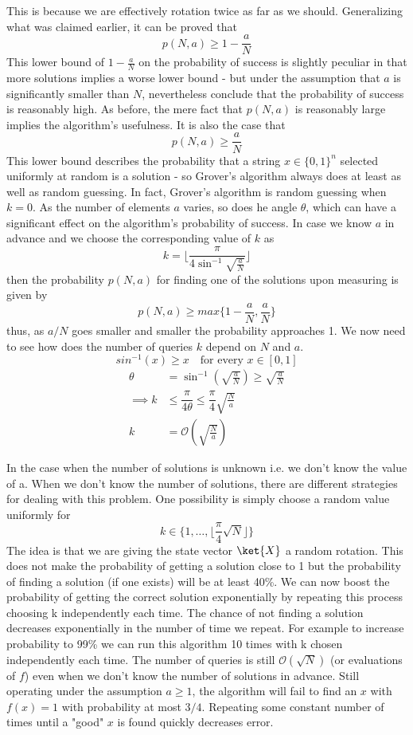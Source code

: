 \documentclass[12pt, oneside]{book}
\theoremstyle{definition}
\theoremstyle{definition}
\theoremstyle{remark}
\begin{document}
This is because we are effectively rotation twice as far as we should.
Generalizing what was claimed earlier, it can be proved that 
\[
p(N,a) \geq 1 -\dfrac{a}{N}
\]
This lower bound of $1-\frac{a}{N}$ on the probability of success is slightly peculiar in that more solutions implies a worse lower bound - but under the assumption that $a$ is significantly smaller than $N$, nevertheless conclude that the probability of success is reasonably high. As before, the mere fact that $p(N,a)$ is reasonably large implies the algorithm's usefulness.
It is also the case that
\[
p(N,a) \geq \frac{a}{N}
\]
This lower bound describes the probability that a string $x \in \{0,1\}^n$ selected uniformly at random is a solution - so Grover's algorithm always does at least as well as random guessing. In fact, Grover's algorithm is random guessing when $k=0$.
As the number of elements $a$ varies, so does he angle $\theta$, which can have a significant effect on the algorithm's probability of success.
In case we know $a$ in advance and we choose the corresponding value of $k$ as 
\[
k=\lfloor \dfrac{\pi}{4\sin^{-1}\sqrt{\frac{a}{N}} }\rfloor
\]
then the probability $p(N,a)$ for finding one of the solutions upon measuring is given by
\[
p(N,a) \geq max\{1-\dfrac{a}{N},\dfrac{a}{N}\}
\]
thus, as $a/N$ goes smaller and smaller the probability approaches 1.
We now need to see how does the number of queries $k$ depend on $N$ and $a$.
\[
sin^{-1} (x) \geq x \quad \text{for every $x \in [0,1]$}
\]
\begin{align*}
    \theta &=\sin^{-1} \left(\sqrt{\frac{a}{N}}\right) \geq \sqrt{\frac{a}{N}}\\
    \implies k&\leq \dfrac{\pi}{4\theta} \leq \dfrac{\pi}{4}\sqrt{\frac{N}{a}}\\
    k&=\mathcal{O}\left(\sqrt{\frac{N}{a}}\right)
\end{align*}

In the case when the number of solutions is unknown i.e. we don't know the value of a. When we don't know the number of solutions, there are different strategies for dealing with this problem. One possibility is simply choose a random value uniformly for
\[
k\in\{1,\ldots, \lfloor \frac{\pi}{4}\sqrt{N}\rfloor\}
\]
The idea is that we are giving the state vector $\ket{X}$ a random rotation. This does not make the probability of getting a solution close to 1 but the probability of finding a solution (if one exists) will be at least 40\%. We can now boost the probability of getting the correct solution exponentially by repeating this process choosing k independently each time. The chance of not finding a solution decreases exponentially in the number of time we repeat. For example to increase probability to 99\% we can run this algorithm 10 times with k chosen independently each time. The number of queries is still $\mathcal{O}(\sqrt{N})$ (or evaluations of $f$) even when we don't know the number of solutions in advance. Still operating under the assumption $a\geq 1$, the algorithm will fail to find an $x$ with $f(x)=1$ with probability at most $3/4$. Repeating some constant number of times until a "good" $x$ is found quickly decreases error.
\end{document}
